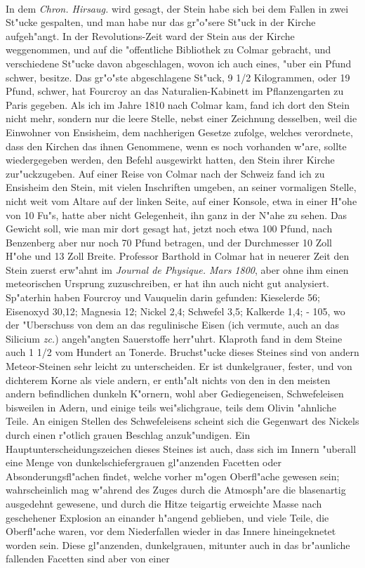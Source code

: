 \documentclass[a4paper, 11pt, oneside, polutonikogreek, german]{article}
\begin{document}
\paragraph{}
In dem \emph{Chron. Hirsaug.} wird gesagt, der Stein habe sich bei dem Fallen in zwei St"ucke gespalten, und man habe nur das gr"o"sere St"uck in der Kirche aufgeh"angt. In der Revolutions-Zeit ward der Stein aus der Kirche weggenommen, und auf die "offentliche Bibliothek zu Colmar gebracht, und verschiedene St"ucke davon abgeschlagen, wovon ich auch eines, "uber ein Pfund schwer, besitze. Das gr"o"ste abgeschlagene St"uck, 9 1/2 Kilogrammen, oder 19 Pfund, schwer, hat Fourcroy an das Naturalien-Kabinett im Pflanzengarten zu Paris gegeben. Als ich im Jahre 1810 nach Colmar kam, fand ich dort den Stein nicht mehr, sondern nur die leere Stelle, nebst einer Zeichnung desselben, weil die Einwohner von Ensisheim, dem nachherigen Gesetze zufolge, welches verordnete, dass den Kirchen das ihnen Genommene, wenn es noch vorhanden w"are, sollte wiedergegeben werden, den Befehl ausgewirkt hatten, den Stein ihrer Kirche zur"uckzugeben. Auf einer Reise von Colmar nach der Schweiz fand ich zu Ensisheim den Stein, mit vielen Inschriften umgeben, an seiner vormaligen Stelle, nicht weit vom Altare auf der linken Seite, auf einer Konsole, etwa in einer H"ohe von 10 Fu"s, hatte aber nicht Gelegenheit, ihn ganz in der N"ahe zu sehen. Das Gewicht soll, wie man mir dort gesagt hat, jetzt noch etwa 100 Pfund, nach Benzenberg aber nur noch 70 Pfund betragen, und der Durchmesser 10 Zoll H"ohe und 13 Zoll Breite. Professor Barthold in Colmar hat in neuerer Zeit den Stein zuerst erw"ahnt im \emph{Journal de Physique. Mars 1800}, aber ohne ihm einen meteorischen Ursprung zuzuschreiben, er hat ihn auch nicht gut analysiert. Sp"aterhin haben Fourcroy und Vauquelin darin gefunden: Kieselerde 56; Eisenoxyd 30,12; Magnesia 12; Nickel 2,4; Schwefel 3,5; Kalkerde 1,4; - 105, wo der "Uberschuss von dem an das regulinische Eisen (ich vermute, auch an das Silicium \emph{zc.}) angeh"angten Sauerstoffe herr"uhrt. Klaproth fand in dem Steine auch 1 1/2 vom Hundert an Tonerde. Bruchst"ucke dieses Steines sind von andern Meteor-Steinen sehr leicht zu unterscheiden. Er ist dunkelgrauer, fester, und von dichterem Korne als viele andern, er enth"alt nichts von den in den meisten andern befindlichen dunkeln K"ornern, wohl aber Gediegeneisen, Schwefeleisen bisweilen in Adern, und einige teils wei"slichgraue, teils dem Olivin "ahnliche Teile. An einigen Stellen des Schwefeleisens scheint sich die Gegenwart des Nickels durch einen r"otlich grauen Beschlag anzuk"undigen. Ein Hauptunterscheidungszeichen dieses Steines ist auch, dass sich im Innern "uberall eine Menge von dunkelschiefergrauen gl"anzenden Facetten oder Absonderungsfl"achen findet, welche vorher m"ogen Oberfl"ache gewesen sein; wahrscheinlich mag w"ahrend des Zuges durch die Atmosph"are die blasenartig ausgedehnt gewesene, und durch die Hitze teigartig erweichte Masse nach geschehener Explosion an einander h"angend geblieben, und viele Teile, die Oberfl"ache waren, vor dem Niederfallen wieder in das Innere hineingeknetet worden sein. Diese gl"anzenden, dunkelgrauen, mitunter auch in das br"aunliche fallenden Facetten sind aber von einer 
\end{document}
